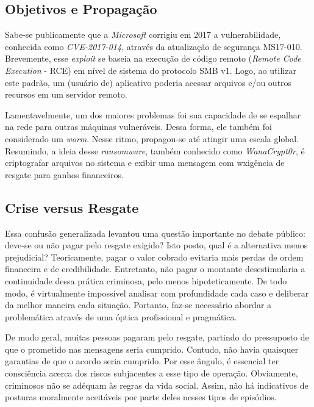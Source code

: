 \documentclass[12pt]{article}
\begin{document}
\subsection{Objetivos e Propagação}
Sabe-se publicamente que a \textit{Microsoft} corrigiu em 2017 a vulnerabilidade, conhecida como \textit{CVE-2017-014}, através da atualização de segurança MS17-010. Brevemente, esse \textit{exploit} se baseia na execução de código remoto (\textit{Remote Code Execution} - RCE) em nível de sistema do protocolo SMB v1. Logo, ao utilizar este padrão, um (usuário de) aplicativo poderia acessar arquivos e/ou outros recursos em um servidor remoto. 

\noindent
Lamentavelmente, um dos maiores problemas foi sua capacidade de se espalhar na rede para outras máquinas vulneráveis. Dessa forma, ele também foi considerado um \textit{worm}. Nesse ritmo, propagou-se até atingir uma escala global. Resumindo, a ideia desse \textit{ransomware}, também conhecido como \textit{WanaCrypt0r}, é criptografar arquivos no sistema e exibir uma mensagem com wxigência de resgate para ganhos financeiros.

\subsection{Crise versus Resgate}
Essa confusão generalizada levantou uma questão importante no debate público: deve-se ou não pagar pelo resgate exigido? Isto posto, qual é a alternativa menos prejudicial? Teoricamente, pagar o valor cobrado evitaria mais perdas de ordem financeira e de credibilidade. Entretanto, não pagar o montante desestimularia a continuidade dessa prática criminosa, pelo menos hipoteticamente. De todo modo, é virtualmente impossível analisar com profundidade cada caso e deliberar da melhor maneira cada situação. Portanto, faz-se necessário abordar a problemática através de uma óptica profissional e pragmática.

\noindent
De modo geral, muitas pessoas pagaram pelo resgate, partindo do pressuposto de que o prometido nas mensagens seria cumprido. Contudo, não havia quaisquer garantias de que o acordo seria cumprido. Por esse ângulo, é essencial ter consciência acerca dos riscos subjacentes a esse tipo de operação. Obviamente, criminosos não se adéquam às regras da vida social. Assim, não há indicativos de posturas moralmente aceitáveis por parte deles nesses tipos de episódios.
\end{document}

